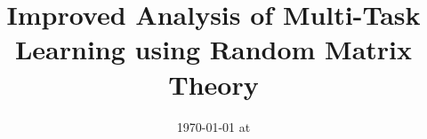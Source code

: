 \documentclass{article}
\begin{document}
\title{Improved Analysis of Multi-Task Learning using Random Matrix Theory}
\date{}
\maketitle
\date{{\ddmmyyyydate\today} at \currenttime}
\date{}




\end{document}
